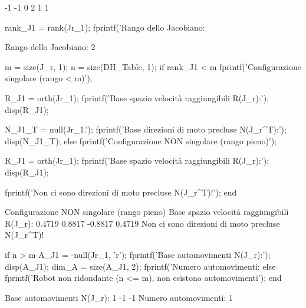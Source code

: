 \documentclass[11pt, a4paper]{article}
\begin{document}
\begin{matlaboutput}
    -1    -1     0
     2     1     1
\end{matlaboutput}
\begin{matlabcode}
rank_J1 = rank(Jr_1);
fprintf('Rango dello Jacobiano: %
\end{matlabcode}
\begin{matlaboutput}
Rango dello Jacobiano: 2
\end{matlaboutput}
\begin{matlabcode}
m = size(J_r, 1);
n = size(DH_Table, 1);
if rank_J1 < m
    fprintf('Configurazione singolare (rango < m)');

    R_J1 = orth(Jr_1);
    fprintf('Base spazio velocità raggiungibili R(J_r):\n');
    disp(R_J1);

    N_J1_T = null(Jr_1.');
    fprintf('Base direzioni di moto precluse N(J_r^T):\n');
    disp(N_J1_T);
else
    fprintf('Configurazione NON singolare (rango pieno)');

    R_J1 = orth(Jr_1);
    fprintf('Base spazio velocità raggiungibili R(J_r):\n');
    disp(R_J1);

    fprintf('Non ci sono direzioni di moto precluse N(J_r^T)!');
end
\end{matlabcode}
\begin{matlaboutput}
Configurazione NON singolare (rango pieno)
Base spazio velocità raggiungibili R(J_r):
    0.4719    0.8817
   -0.8817    0.4719
Non ci sono direzioni di moto precluse N(J_r^T)!
\end{matlaboutput}
\begin{matlabcode}
if n > m
    A_J1 = -null(Jr_1, 'r');
    fprintf('Base automovimenti N(J_r):\n');
    disp(A_J1);
    dim_A = size(A_J1, 2);
    fprintf('Numero automovimenti: %
else
    fprintf('Robot non ridondante (n <= m), non esistono automovimenti\n');
end
\end{matlabcode}
\begin{matlaboutput}
Base automovimenti N(J_r):
     1
    -1
    -1
Numero automovimenti: 1
\end{matlaboutput}
\end{document}
